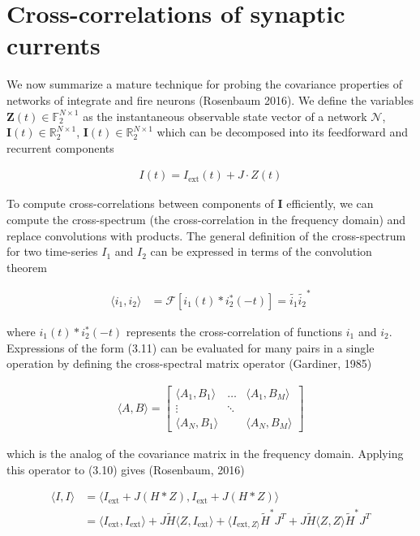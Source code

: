 \documentclass{ucetd}
\begin{document}
\section{Cross-correlations of synaptic currents}

We now summarize a mature technique for probing the covariance properties of networks of integrate and fire neurons (Rosenbaum 2016). We define the variables $\mathbf{Z}(t)\in \mathbb{F}_{2}^{N\times 1}$ as the instantaneous observable state vector of a network $\mathcal{N}$, $\mathbf{I}(t)\in \mathbb{R}_{2}^{N\times 1}$, $\mathbf{I}(t)\in \mathbb{R}_{2}^{N\times 1}$ which can be decomposed into its feedforward and recurrent components

\begin{align}
I(t) = I_{\mathrm{ext}}(t) + J\cdot Z(t)
\end{align}

To compute cross-correlations between components of $\mathbf{I}$ efficiently, we can compute the cross-spectrum (the cross-correlation in the frequency domain) and replace convolutions with products. The general definition of the cross-spectrum for two time-series $I_{1}$ and $I_{2}$ can be expressed in terms of the convolution theorem

\begin{align}
\langle i_{1}, i_{2}\rangle &= \mathcal{F}\left[i_{1}(t)*i_{2}^{*}(-t)\right] = \tilde{i_{1}}\tilde{i_{2}}^{*}
\end{align}

where $i_{1}(t)*i_{2}^{*}(-t)$ represents the cross-correlation of functions $i_{1}$ and $i_{2}$. Expressions of the form (3.11) can be evaluated for many pairs in a single operation by defining the cross-spectral matrix operator (Gardiner, 1985)

\begin{align}
\langle A, B\rangle = \begin{bmatrix} 
    \langle A_{1}, B_{1}\rangle  & \dots & \langle A_{1}, B_{M}\rangle\\
    \vdots & \ddots & \\
    \langle A_{N}, B_{1}\rangle &        & \langle A_{N}, B_{M}\rangle
    \end{bmatrix}
\end{align}

which is the analog of the covariance matrix in the frequency domain. Applying this operator to (3.10) gives (Rosenbaum, 2016)

\begin{align}
\langle I, I \rangle &= \langle I_{\mathrm{ext}} + J(H*Z), I_{\mathrm{ext}} + J(H*Z) \rangle\\
&= \langle I_{\mathrm{ext}}, I_{\mathrm{ext}}\rangle  + J\tilde{H}\langle Z, I_{\mathrm{ext}} \rangle + \langle I_{\mathrm{ext}, Z\rangle}\tilde{H}^{*}J^{T} + J\tilde{H}\langle Z, Z\rangle \tilde{H}^{*}J^{T}
\end{align}
\end{document}
